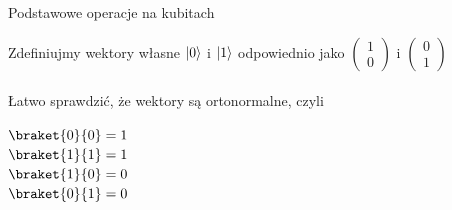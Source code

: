 \documentclass{beamer}
\DeclarePairedDelimiter\ket{\lvert}{\rangle}
\begin{document}
	\begin{frame}{Podstawowe operacje na kubitach}
		\begin{block}{   }
			\vspace{0.5em}
			Zdefiniujmy wektory własne $\ket{0}$ i $\ket{1}$ odpowiednio jako
			$\begin{pmatrix}
				1\\
				0
			\end{pmatrix}$
			i
			$\begin{pmatrix}
				0\\
				1
			\end{pmatrix}$
			\\~\\
			Łatwo sprawdzić, że wektory są ortonormalne, czyli
			\begin{multicols}{4}
				$\braket{0}{0} = 1$\\
				$\braket{1}{1} = 1$\\
				$\braket{1}{0} = 0$\\
				$\braket{0}{1} = 0$
			\end{multicols}
			\vspace{0.5em}
		\end{block}
	\end{frame}
\end{document}
